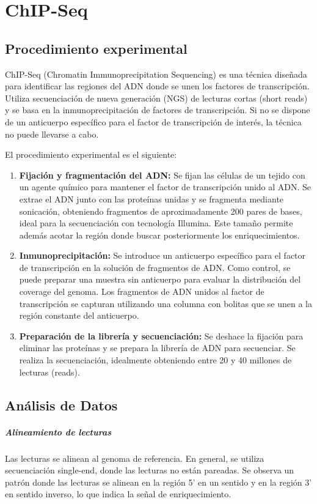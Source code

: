 \chapter{ChIP-Seq}
\section{Procedimiento experimental}
ChIP-Seq (Chromatin Immunoprecipitation Sequencing) es una técnica diseñada para identificar las regiones del ADN donde se unen los factores de transcripción. Utiliza secuenciación de nueva generación (NGS) de lecturas cortas (short reads) y se basa en la inmunoprecipitación de factores de transcripción. Si no se dispone de un anticuerpo específico para el factor de transcripción de interés, la técnica no puede llevarse a cabo.

El procedimiento experimental es el siguiente:
\begin{enumerate}
\item \textbf{Fijación y fragmentación del ADN:} Se fijan las células de un tejido con un agente químico para mantener el factor de transcripción unido al ADN. Se extrae el ADN junto con las proteínas unidas y se fragmenta mediante sonicación, obteniendo fragmentos de aproximadamente 200 pares de bases, ideal para la secuenciación con tecnología Illumina. Este tamaño permite además acotar la región donde buscar posteriormente los enriquecimientos.
\item \textbf{Inmunoprecipitación:} Se introduce un anticuerpo específico para el factor de transcripción en la solución de fragmentos de ADN.
Como control, se puede preparar una muestra sin anticuerpo para evaluar la distribución del coverage del genoma.
Los fragmentos de ADN unidos al factor de transcripción se capturan utilizando una columna con bolitas que se unen a la región constante del anticuerpo.
\item \textbf{Preparación de la librería y secuenciación:} Se deshace la fijación para eliminar las proteínas y se prepara la librería de ADN para secuenciar.
Se realiza la secuenciación, idealmente obteniendo entre 20 y 40 millones de lecturas (reads).
\end{enumerate}

\section{Análisis de Datos}
\paragraph{Alineamiento de lecturas}
Las lecturas se alinean al genoma de referencia. En general, se utiliza secuenciación single-end, donde las lecturas no están pareadas.
Se observa un patrón donde las lecturas se alinean en la región 5' en un sentido y en la región 3' en sentido inverso, lo que indica la señal de enriquecimiento.

